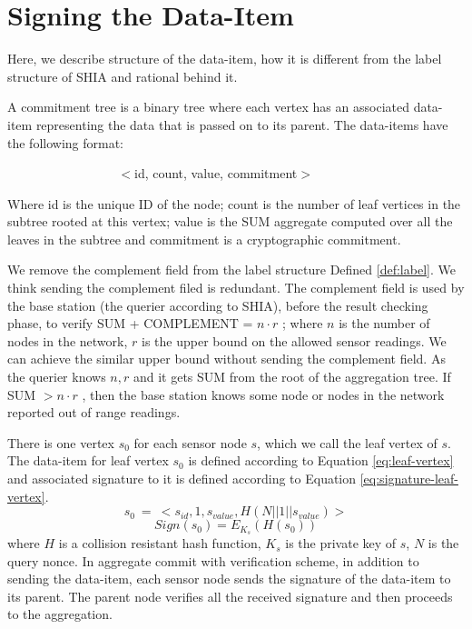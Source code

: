\section{Signing the Data-Item}
	
	Here, we describe structure of the data-item, how it is different from the label structure of SHIA and rational behind it.	
	\begin{definition}
		\label{def:data-item}
		A commitment tree is a binary tree where each vertex has an associated data-item representing the data that is passed on to its parent. The data-items have the following format:

		$\hspace{100pt}$ $<$id, count, value, commitment$>$
	\end{definition}
	Where id is the unique ID of the node; count is the number of leaf vertices in the subtree rooted at this vertex; value is the SUM aggregate computed over all the leaves in the subtree and commitment is a cryptographic commitment.
	
	We remove the complement field from the label structure Defined \ref{def:label}. 
	We think sending the complement filed is redundant. 
	The complement field is used by the base station (the querier according to SHIA), before the result checking phase, to verify SUM + COMPLEMENT = $n \cdot r$ ; where $n$ is the number of nodes in the network, $r$ is the upper bound on the allowed sensor readings.
	We can achieve the similar upper bound without sending the complement field.
	As the querier knows $n, r$ and it gets SUM from the root of the aggregation tree.
	If SUM $> n \cdot r$ , then the base station knows some node or nodes in the network reported out of range readings. 

	There is one vertex $s_{0}$ for each sensor node $s$, which we call the leaf vertex of $s$.
	The data-item for leaf vertex $s_{0}$ is defined according to Equation \ref{eq:leaf-vertex} and associated signature to it is defined according to Equation \ref{eq:signature-leaf-vertex}.
	\begin{equation}
		\label{eq:leaf-vertex}
		s_{0}\ =\ <s_{id}, 1, s_{value}, H(N||1||s_{value})>
	\end{equation}
	\begin{equation}
		\label{eq:signature-leaf-vertex}
		Sign(s_{0}) = E_{K_{s}}(H(s_{0}))
	\end{equation}
	where $H$ is a collision resistant hash function, $K_{s}$ is the private key of $s$, $N$ is the query nonce.
	In aggregate commit with verification scheme, in addition to sending the data-item, each sensor node sends the signature of the data-item to its parent.
	The parent node verifies all the received signature and then proceeds to the aggregation.
	
